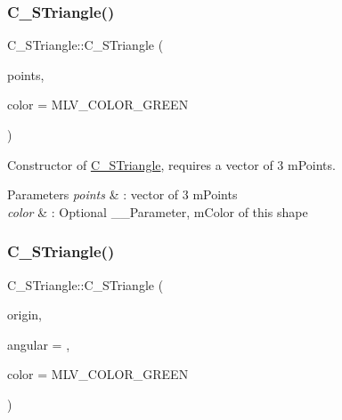 \subsubsection{\texorpdfstring{C\+\_\+\+S\+Triangle()}{C\_STriangle()}\hspace{0.1cm}{\footnotesize\ttfamily [3/4]}}
{\footnotesize\ttfamily C\+\_\+\+S\+Triangle\+::\+C\+\_\+\+S\+Triangle (\begin{DoxyParamCaption}\item[{const std\+::vector$<$ \hyperlink{classT__Point}{T\+\_\+\+Point}$<$ double $>$$>$ \&}]{points,  }\item[{M\+L\+V\+\_\+\+Color}]{color = {\ttfamily MLV\+\_\+COLOR\+\_\+GREEN} }\end{DoxyParamCaption})\hspace{0.3cm}{\ttfamily [explicit]}}



Constructor of \hyperlink{classC__STriangle}{C\+\_\+\+S\+Triangle}, requires a vector of 3 m\+Points. 


\begin{DoxyParams}{Parameters}
{\em points} & \+: vector of 3 m\+Points \\
\hline
{\em color} & \+: Optional \+\_\+\+\_\+\+Parameter, m\+Color of this shape \\
\hline
\end{DoxyParams}
\mbox{\label{classC__STriangle_aee7b2ac8280dde9b86f5c3ad973fd692}} 
\subsubsection{\texorpdfstring{C\+\_\+\+S\+Triangle()}{C\_STriangle()}\hspace{0.1cm}{\footnotesize\ttfamily [4/4]}}
{\footnotesize\ttfamily C\+\_\+\+S\+Triangle\+::\+C\+\_\+\+S\+Triangle (\begin{DoxyParamCaption}\item[{const \hyperlink{classT__Point}{T\+\_\+\+Point}$<$ double $>$ \&}]{origin,  }\item[{double}]{angular = {},  }\item[{M\+L\+V\+\_\+\+Color}]{color = {\ttfamily MLV\+\_\+COLOR\+\_\+GREEN} }\end{DoxyParamCaption})\hspace{0.3cm}{\ttfamily [explicit]}}



